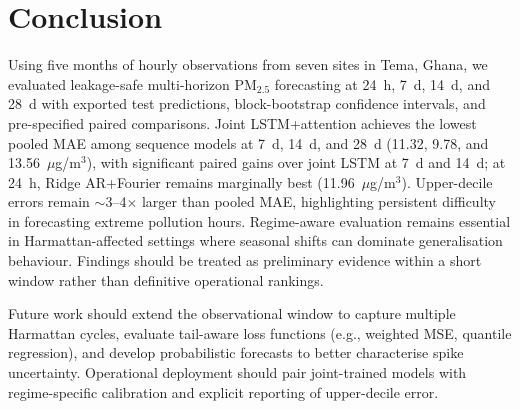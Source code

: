 \documentclass[a4paper,fleqn]{cas-sc}
\begin{document}
\section{Conclusion}\label{sec5}

Using five months of hourly observations from seven sites in Tema, Ghana, we evaluated leakage-safe multi-horizon PM$_{2.5}$ forecasting at 24~h, 7~d, 14~d, and 28~d with exported test predictions, block-bootstrap confidence intervals, and pre-specified paired comparisons. Joint LSTM+attention achieves the lowest pooled MAE among sequence models at 7~d, 14~d, and 28~d (11.32, 9.78, and 13.56~$\mu$g/m$^3$), with significant paired gains over joint LSTM at 7~d and 14~d; at 24~h, Ridge AR+Fourier remains marginally best (11.96~$\mu$g/m$^3$). Upper-decile errors remain $\sim$3--4$\times$ larger than pooled MAE, highlighting persistent difficulty in forecasting extreme pollution hours. Regime-aware evaluation remains essential in Harmattan-affected settings where seasonal shifts can dominate generalisation behaviour. Findings should be treated as preliminary evidence within a short window rather than definitive operational rankings.

Future work should extend the observational window to capture multiple Harmattan cycles, evaluate tail-aware loss functions (e.g., weighted MSE, quantile regression), and develop probabilistic forecasts to better characterise spike uncertainty. Operational deployment should pair joint-trained models with regime-specific calibration and explicit reporting of upper-decile error.



\printcredits

% 






\end{document}
